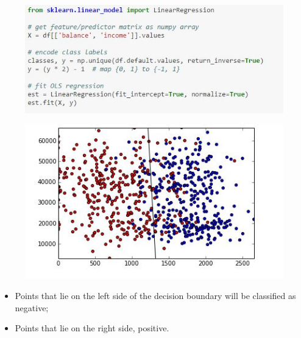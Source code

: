\documentclass[MASTER.tex]{subfiles}
\begin{document}
\begin{frame}
\begin{figure}
\centering
\includegraphics[width=0.99\linewidth]{sklcass/sklclass6}
\end{figure}

\end{frame}
\begin{frame}
\begin{figure}
\centering
\includegraphics[width=0.99\linewidth]{sklcass/sklclass7}

\end{figure}

\end{frame}
\begin{frame}
	\begin{itemize}
	\item Points that lie on the left side of the decision boundary will be classified as negative; 
	\item Points that lie on the right side, positive. 
	\end{itemize}

\end{frame}
\end{document}
